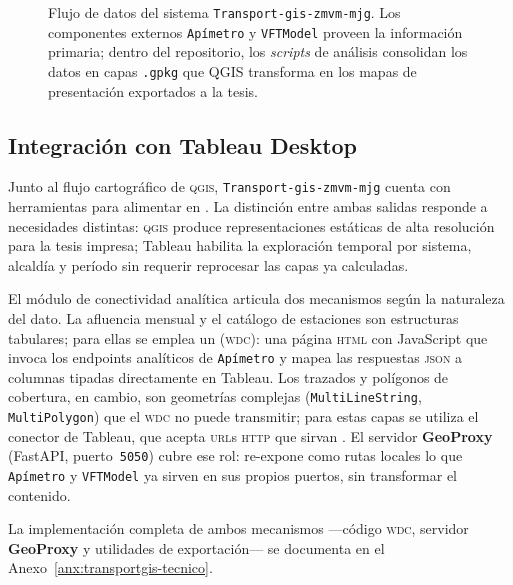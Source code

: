 \begin{figure}[htbp]
\centering

\caption[Pipeline de producción cartográfica de \texttt{Transport-gis-zmvm-mjg}]%
  {Flujo de datos del sistema \texttt{Transport-gis-zmvm-mjg}.
Los componentes externos \texttt{Apímetro} y \texttt{VFTModel} proveen la
información primaria;
dentro del repositorio, los \textit{scripts} de análisis consolidan los datos en
capas \texttt{.gpkg}
  que QGIS transforma en los mapas de presentación exportados a la tesis.}
\label{fig:tg-pipeline}
\end{figure}

\subsection{Integración con Tableau Desktop}
\label{subsubsec:tg-tableau}

Junto al flujo cartográfico de \textsc{qgis}, \texttt{Transport-gis-zmvm-mjg} cuenta con
herramientas para alimentar  en . La distinción
entre ambas salidas responde a necesidades distintas: \textsc{qgis} produce
representaciones estáticas de alta resolución para la tesis impresa; Tableau
habilita la exploración temporal por sistema, alcaldía y período sin requerir
reprocesar las capas ya calculadas.

El módulo de conectividad analítica articula dos mecanismos según la naturaleza
del dato. La afluencia mensual y el catálogo de estaciones son estructuras
tabulares; para ellas se emplea un  (\textsc{wdc}):
una página \textsc{html} con JavaScript que invoca los endpoints analíticos de
\texttt{Apímetro} y mapea las respuestas \textsc{json} a columnas tipadas
directamente en Tableau. Los trazados y polígonos de cobertura, en cambio, son
geometrías complejas (\texttt{MultiLineString}, \texttt{MultiPolygon}) que el
\textsc{wdc} no puede transmitir; para estas capas se utiliza el conector
 de Tableau, que acepta \textsc{url}s \textsc{http} que
sirvan \geojson{}. El servidor \textbf{GeoProxy} (FastAPI, puerto~\texttt{5050})
cubre ese rol: re-expone como rutas locales lo que \texttt{Apímetro} y
\texttt{VFTModel} ya sirven en sus propios puertos, sin transformar el
contenido.

La implementación completa de ambos mecanismos —código \textsc{wdc}, servidor
\textbf{GeoProxy} y utilidades de exportación— se documenta en el
Anexo~\ref{anx:transportgis-tecnico}.
